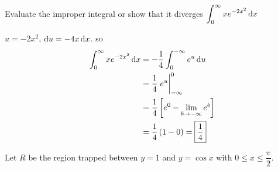 \documentclass[12pt,answers]{exam}
\begin{document}
\begin{questions}

\question[10]
Evaluate the improper integral or show that it diverges
$\displaystyle \int_0^\infty x e^{-2x^2} \dif x$
\begin{solution}
$u = -2x^2$, $\dif u = -4 x \dif x$. 
so
\begin{align*}
    \int_0^\infty x e^{-2x^2} \dif x
    &= -\frac 14 \int_0^{-\infty} e^{u} \dif u \\ 
    &= \frac14 \eval{e^{u}}_{-\infty}^0 \\
    &= \frac14 \left[ e^0 - \lim_{b\to-\infty} e^b \right] \\ 
    &= \frac14 \left( 1 - 0 \right) 
    = \boxed{\frac14}
\end{align*}
\end{solution}

\newpage
\question
Let $R$ be the region trapped between $y = 1$ and $y = \cos x$ with $0 \le x \le \dfrac\pi2$.
\begin{parts}

\end{parts}
\end{questions}
\end{document}
